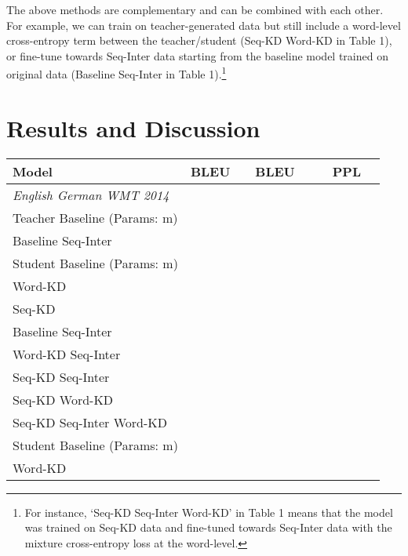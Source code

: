 \documentclass[11pt,letterpaper]{article}
\begin{document}
The above methods are complementary and can be combined with each other. For example,
we can train on teacher-generated data but still include a word-level cross-entropy term
between the teacher/student (Seq-KD  Word-KD in Table 1), or fine-tune towards
Seq-Inter data starting from the baseline model trained on original data
(Baseline  Seq-Inter in Table 1).\footnote{For instance, `Seq-KD  Seq-Inter  Word-KD' in Table 1 means
that the model was trained on Seq-KD data and fine-tuned towards Seq-Inter data with the
mixture cross-entropy loss at the word-level.}

\section{Results and Discussion}\label{results}
\begin{table*}[!ht] \label{de}
\centering
\small
\begin{tabular}{l c c  c c r r r }
\toprule
Model &    BLEU &  & BLEU &  & & PPL &  \\
\midrule
\textit{English  German WMT 2014} \\ 
\midrule
Teacher Baseline   (Params: m)  &  &   & &    & &   &   \\
\hspace{4mm} Baseline   Seq-Inter  &  & &  & &  &  &    \\
\midrule
Student Baseline   (Params: m)  &  &  & &   & &  &   \\
\hspace{4mm} Word-KD  &  & & & & &  &   \\
\hspace{4mm} Seq-KD   &  & & & & &  &  \\
\hspace{4mm} Baseline  Seq-Inter   &  & & & & &  &  \\
\hspace{4mm} Word-KD  Seq-Inter  &  & & & & &  &  \\
\hspace{4mm} Seq-KD  Seq-Inter  &  & & &  & &  &   \\
\hspace{4mm} Seq-KD  Word-KD  &  & & & & &  &   \\
\hspace{4mm} Seq-KD  Seq-Inter  Word-KD  &  & & & & &  &  \\
\midrule
Student Baseline   (Params: m) &  &  & &   &  &  &  \\
\hspace{4mm}  Word-KD  &  & & & & &  &   \\

\end{tabular}
\end{table*}
\end{document}

